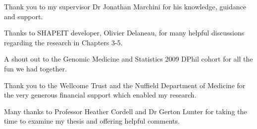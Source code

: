 \documentclass[twoside,openright,12pt]{ociamthesis}  %
\begin{document}
\begin{acknowledgements}
Thank you to my supervisor Dr Jonathan Marchini for his knowledge, guidance and support.

Thanks to SHAPEIT developer, Olivier Delaneau, for many helpful discussions regarding the research in Chapters 3-5.

A shout out to the Genomic Medicine and Statistics 2009 DPhil cohort for all the fun we had together.

Thank you to the Wellcome Trust and the Nuffield Department of
Medicine for the very generous financial support which enabled my
research.

Many thanks to Professor Heather Cordell and Dr Gerton Lunter for
taking the time to examine my thesis and offering helpful comments.
\end{acknowledgements}

\begin{romanpages}          %
\tableofcontents            %
\listoffigures              %
\listoftables
\end{romanpages}            %

\doublespacing












\end{document}
